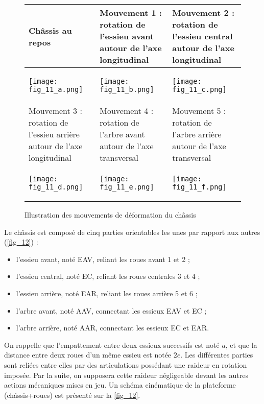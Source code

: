 \begin{figure}[H]
\centering
\begin{tabular}{|p{.3\linewidth}|p{.3\linewidth}|p{.3\linewidth}|}
\hline
Châssis au repos & Mouvement 1 : rotation de l'essieu avant
autour de l'axe longitudinal & Mouvement 2 :
rotation de l'essieu central
autour de l'axe longitudinal \\ \hline
\begin{center}
\texttt{[image: fig\_11\_a.png]}
\end{center}
&
\begin{center}
\texttt{[image: fig\_11\_b.png]}
\end{center}
&
\begin{center}
\texttt{[image: fig\_11\_c.png]}
\end{center} \\ \hline
Mouvement 3 :
rotation de l'essieu arrière
autour de l'axe longitudinal & 
Mouvement 4 :
rotation de l'arbre avant
autour de l'axe transversal &
Mouvement 5 :
rotation de l'arbre arrière
autour de l'axe transversal \\ \hline
\begin{center}
\texttt{[image: fig\_11\_d.png]}
\end{center}
&
\begin{center}
\texttt{[image: fig\_11\_e.png]}
\end{center}
&
\begin{center}
\texttt{[image: fig\_11\_f.png]}
\end{center} \\ \hline
\end{tabular}

\caption{Illustration des mouvements de déformation du châssis\label{fig_11}}
\end{figure}

Le châssis est composé de cinq parties orientables les unes par rapport aux autres (\autoref{fig_12}) :
\begin{itemize}
\item l'essieu avant, noté EAV, reliant les roues avant 1 et 2 ;
\item l'essieu central, noté EC, reliant les roues centrales 3 et 4 ;
\item l'essieu arrière, noté EAR, reliant les roues arrière 5 et 6 ;
\item l'arbre avant, noté AAV, connectant les essieux EAV et EC ;
\item l'arbre arrière, noté AAR, connectant les essieux EC et EAR.
\end{itemize}
On rappelle que l'empattement entre deux essieux successifs est noté $a$, et que la distance entre
deux roues d'un même essieu est notée $2e$.
Les différentes parties sont reliées entre elles par des articulations possédant une raideur en
rotation imposée. Par la suite, on supposera cette raideur négligeable devant les autres actions
mécaniques mises en jeu.
Un schéma cinématique de la plateforme (châssis+roues) est présenté sur la \autoref{fig_12}.

